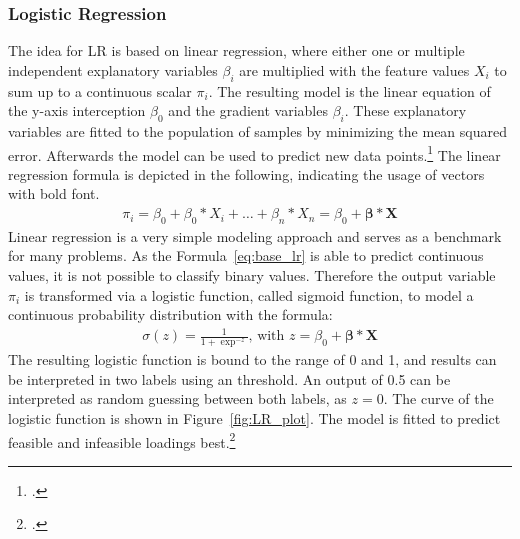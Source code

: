\subsubsection{Logistic Regression}

The idea for \gls{LR} is based on linear regression, where either one or multiple independent explanatory
variables $\beta_i$ are multiplied with the feature values $X_i$ to sum up to a continuous scalar $\pi_i$.
The resulting model is the linear equation of the y-axis interception $\beta_0$
and the gradient variables $\beta_i$.
These explanatory variables are fitted to the population of samples by minimizing the mean squared
error. Afterwards the model can be used to predict new data points.\footcite[cf.][pp. 6-7]{nasteski_overview_2017}
The linear regression formula is depicted in the following, indicating the usage of vectors with bold font.
\begin{align}
    \pi_i=\beta_0+\beta_0*X_i+\dots+\beta_n*X_n = \beta_0 + \bm{\beta} * \bm{X}
    \label{eq:base_lr}
\end{align}
Linear regression is a very simple modeling approach and serves as a benchmark for many problems. As the Formula~\ref{eq:base_lr} is able to predict continuous
values, it is not possible to classify binary values. Therefore the output variable $\pi_i$ is transformed via a logistic function, called sigmoid function,
to model a continuous probability distribution with the formula:
\begin{align}
    \sigma(z)=\frac{1}{1+\exp^{-z}},\, \text{with } z = \beta_0 + \bm{\beta} * \bm{X}
    \label{eq:logistic_func}
\end{align}
The resulting logistic function is bound to the range of 0 and 1, and results can be interpreted
in two labels using an threshold. An output of 0.5 can be interpreted as random
guessing between both labels, as $z=0$. The curve of the logistic function is shown in Figure~\ref{fig:LR_plot}.
The model is fitted to predict feasible and infeasible loadings best.\footcite[cf.][]{kirasich_random_2018}
